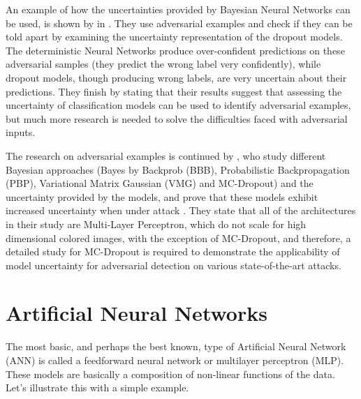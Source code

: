 An example of how the uncertainties provided by Bayesian Neural Networks can be used, is shown by \citeauthor{li2017dropout} in \cite{li2017dropout}. They use adversarial examples and check if they can be told apart by examining the uncertainty representation of the dropout models. The deterministic Neural Networks produce over-confident predictions on these adversarial samples (they predict the wrong label very confidently), while dropout models, though producing wrong labels, are very uncertain about their predictions. They finish by stating that their results suggest that assessing the uncertainty of classification models can be used to identify adversarial examples, but much more research is needed to solve the difficulties faced with adversarial inputs.

The research on adversarial examples is continued by \citeauthor{rawat2017adversarial}, who study different Bayesian approaches (Bayes by Backprob (BBB), Probabilistic Backpropagation (PBP), Variational Matrix Gaussian (VMG) and MC-Dropout) and the uncertainty provided by the models, and prove that these models exhibit increased uncertainty when under attack \cite{rawat2017adversarial}. They state that all of the architectures in their study are Multi-Layer Perceptron, which do not scale for high dimensional colored images, with the exception of MC-Dropout, and therefore, a detailed study for MC-Dropout is required to demonstrate the applicability of model uncertainty for adversarial detection on various state-of-the-art attacks.

\section{Artificial Neural Networks}

The most basic, and perhaps the best known, type of Artificial Neural Network (ANN) is called a feedforward neural network or multilayer perceptron (MLP). These models are basically a composition of non-linear functions of the data. Let's illustrate this with a simple example.

